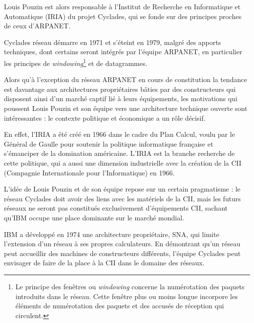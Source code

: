 \documentclass{FramateX}
\begin{document}
\begin{refsection}
Louis Pouzin est alors responsable à l'Institut de
Recherche en Informatique et Automatique (IRIA) du projet Cyclades, qui
se fonde sur des principes proches de ceux d'ARPANET. 

Cyclades réseau démarre en 1971 et s'éteint en 1979,
malgré des apports techniques, dont certains seront intégrés par
l'équipe ARPANET, en particulier les principes de
\textit{windowing}\footnote{Le principe des fenêtres ou \textit{windowing} concerne la numérotation des paquets introduits
dans le réseau. Cette fenêtre plus ou moins longue incorpore les
éléments de numérotation des paquets et des accusés de réception qui
circulent.} et de datagrammes. 

Alors qu'à
l'exception du réseau ARPANET en cours
de constitution la tendance est davantage aux architectures
propriétaires bâties par des constructeurs qui disposent ainsi
d'un marché captif lié à leurs équipements, les motivations qui poussent Louis Pouzin et son équipe vers une
architecture technique ouverte sont
intéressantes : le contexte politique et économique a un rôle décisif. 

En effet, l'IRIA a été créé en 1966 dans le cadre du
Plan Calcul, voulu par le Général de Gaulle pour soutenir la politique
informatique française et s'émanciper de la domination
américaine. L'IRIA est la branche recherche de cette
politique, qui a aussi une dimension industrielle avec la création de
la CII (Compagnie Internationale pour l'Informatique)
en 1966. 

L'idée de Louis Pouzin et de son équipe repose sur un
certain pragmatisme : le réseau Cyclades doit avoir des liens avec les
matériels de la CII, mais les futurs réseaux ne seront pas constitués
exclusivement d'équipements CII, sachant
qu'IBM occupe une place dominante sur le marché
mondial. 

IBM a développé en 1974 une architecture propriétaire, SNA, qui limite
l'extension d'un réseau à ses propres
calculateurs. En démontrant qu'un réseau peut
accueillir des machines de constructeurs différents,
l'équipe Cyclades peut envisager de faire de la place
à la CII dans le domaine des réseaux. 


\end{refsection}
\end{document}
